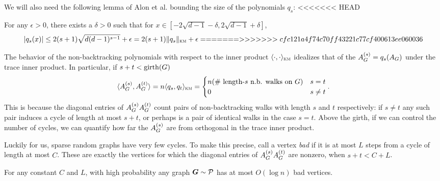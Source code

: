 
We will also need the following lemma of Alon et al. \cite[Lemma 2.3]{alon2007non} bounding the size of the polynomials $q_s$:
<<<<<<< HEAD
\begin{lemma} \label{lem:NBW-poly-bound}
    For any $\epsilon>0$, there exists a $\delta>0$ such that for $x\in[-2\sqrt{d-1}-\delta,2\sqrt{d-1}+\delta]$,
    $$
        |q_s(x)| \le 2(s+1)\sqrt{d(d-1)^{s-1}} + \epsilon = 2(s+1)\|q_s\|_{\textsc{km}} + \epsilon
=======
>>>>>>> cfc121a4f74c70ff43221c77cf400613ee060036
    $$
\end{lemma}

The behavior of the non-backtracking polynomials with respect to the inner product $\langle \cdot,\cdot \rangle_{\textsc{km}}$ idealizes that of the $A^{(s)}_{G} = q_s(A_{G})$ under the trace inner product. In particular, if $s + t < \operatorname{girth}(G)$
$$
    \langle A^{(s)}_{G},A^{(t)}_{G} \rangle = n\langle q_s,q_t \rangle_{\textsc{km}} = \begin{cases} n (\text{\# length-$s$ n.b. walks on $G$}) & s=t \\ 0 & s \neq t \end{cases}.
$$
This is because the diagonal entries of $A^{(s)}_{G}A^{(t)}_{G}$ count pairs of non-backtracking walks with length $s$ and $t$ respectively: if $s\neq t$ any such pair induces a cycle of length at most $s+t$, or perhaps is a pair of identical walks in the case $s=t$. Above the girth, if we can control the number of cycles, we can quantify how far the $A^{(s)}_{G}$ are from orthogonal in the trace inner product.

Luckily for us, sparse random graphs have very few cycles. To make this precise, call a vertex \emph{bad} if it is at most $L$ steps from a cycle of length at most $C$. These are exactly the vertices for which the diagonal entries of $A^{(s)}_{G}A^{(t)}_{G}$ are nonzero, when $s+t < C+L$.

\begin{lemma} \label{lem:bad-vtx}
    For any constant $C$ and $L$, with high probability any graph $\boldsymbol{G} \sim \mathcal{P}$ has at most $O(\log n)$ bad vertices.
\end{lemma}

